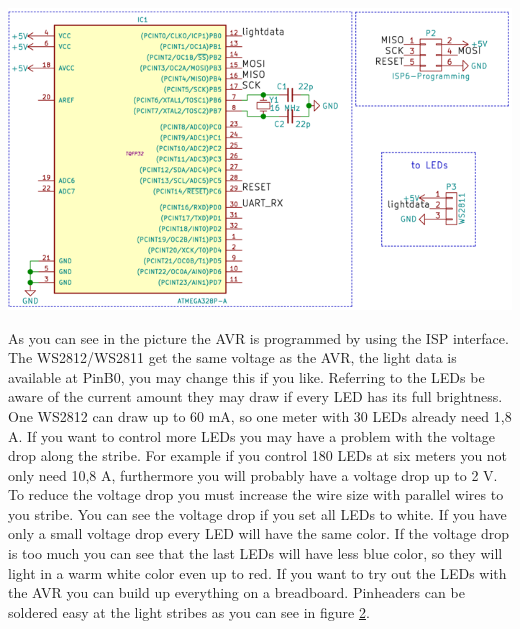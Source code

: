 \begin{DoxyImage}
\includegraphics[width=\textwidth,height=\textheight/2,keepaspectratio=true]{Ws2811_Atmega328_schematic.png}
\caption{schematic of the A\+V\+R to controll W\+S2812/\+W\+S2811}
\end{DoxyImage}
  As you can see in the picture the A\+V\+R is programmed by using the I\+S\+P interface. The W\+S2812/\+W\+S2811 get the same voltage as the A\+V\+R, the light data is available at Pin\+B0, you may change this if you like. Referring to the L\+E\+Ds be aware of the current amount they may draw if every L\+E\+D has its full brightness. One W\+S2812 can draw up to 60 m\+A, so one meter with 30 L\+E\+Ds already need 1,8 A. If you want to control more L\+E\+Ds you may have a problem with the voltage drop along the stribe. For example if you control 180 L\+E\+Ds at six meters you not only need 10,8 A, furthermore you will probably have a voltage drop up to 2 V. To reduce the voltage drop you must increase the wire size with parallel wires to you stribe. You can see the voltage drop if you set all L\+E\+Ds to white. If you have only a small voltage drop every L\+E\+D will have the same color. If the voltage drop is too much you can see that the last L\+E\+Ds will have less blue color, so they will light in a warm white color even up to red. If you want to try out the L\+E\+Ds with the A\+V\+R you can build up everything on a breadboard. Pinheaders can be soldered easy at the light stribes as you can see in figure \hyperlink{index_two}{2}. \label{index_two}%
\hypertarget{index_two}{}%
  
